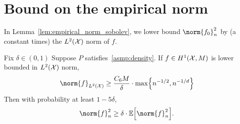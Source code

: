 \section{Bound on the empirical norm}
\label{sec:empirical_norm}

In Lemma~\ref{lem:empirical_norm_sobolev}, we lower bound $\norm{f_0}_n^2$ by (a constant times) the $L^2(\mathcal{X})$ norm of $f$.

\begin{lemma}
	\label{lem:empirical_norm_sobolev}
	Fix $\delta \in (0,1)$ Suppose $P$ satisfies~\ref{asmp:density}. If $f \in H^1(\mathcal{X},M)$ is lower bounded in $L^2(\mathcal{X})$ norm,
	\begin{equation}
	\label{eqn:empirical_norm_sobolev_1}
	\norm{f}_{\Leb^2(\Xset)} \geq \frac{C_6 M}{\delta} \cdot \max\Bigl\{n^{-1/2},n^{-1/d}\Bigr\}
	\end{equation}
	Then with probability at least $1 - 5 \delta$,
	\begin{equation}
	\label{eqn:empirical_norm_sobolev}
	\norm{f}_n^2 \geq \delta \cdot \Ebb\Bigl[\norm{f}_n^2\Bigr].
	\end{equation}
\end{lemma}

